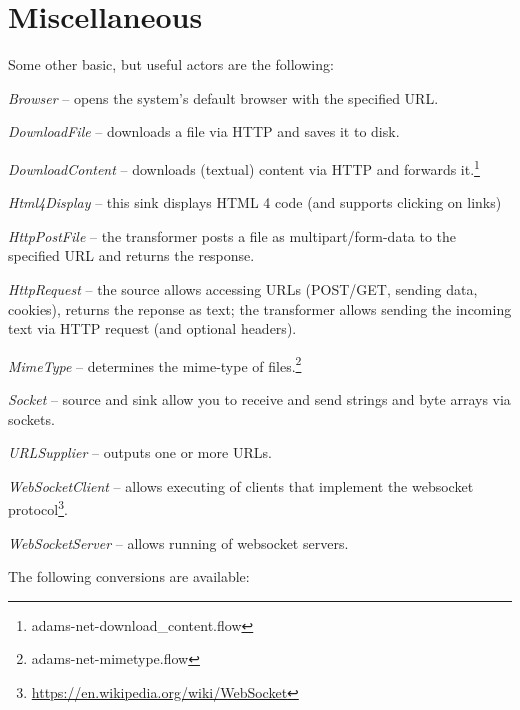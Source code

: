 \documentclass[a4paper]{book}
\begin{document}
\chapter{Miscellaneous}
Some other basic, but useful actors are the following:
\begin{tight_itemize}
	\item \textit{Browser} -- opens the system's default browser with the specified
	URL.
	\item \textit{DownloadFile} -- downloads a file via HTTP and saves it to disk.
	\item \textit{DownloadContent} -- downloads (textual) content via HTTP and 
	forwards it.\footnote{adams-net-download\_content.flow}
	\item \textit{Html4Display} -- this sink displays HTML 4 code (and supports clicking on links)
	\item \textit{HttpPostFile} -- the transformer posts a file as multipart/form-data
	to the specified URL and returns the response.
	\item \textit{HttpRequest} -- the source allows accessing URLs (POST/GET, sending data,
	cookies), returns the reponse as text; the transformer allows
	sending the incoming text via HTTP request (and optional headers).
	\item \textit{MimeType} -- determines the mime-type of
	files.\footnote{adams-net-mimetype.flow}
	\item \textit{Socket} -- source and sink allow you to receive and send
	strings and byte arrays via sockets.
	\item \textit{URLSupplier} -- outputs one or more URLs.
	\item \textit{WebSocketClient} -- allows executing of clients that implement
	the websocket protocol\footnote{\url{https://en.wikipedia.org/wiki/WebSocket}{}}.
	\item \textit{WebSocketServer} -- allows running of websocket servers.
\end{tight_itemize}
The following conversions are available:
\end{document}
